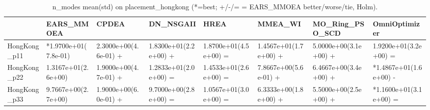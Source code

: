 \begin{table}[t]
\centering
\caption{n_modes mean(std) on placement_hongkong (*=best; +/-/= = EARS_MMOEA better/worse/tie, Holm).}
\label{tab:placement_hongkong_n_modes}
\begin{tabular}{llllllll}
\toprule
 & EARS\_MMOEA & CPDEA & DN\_NSGAII & HREA & MMEA\_WI & MO\_Ring\_PSO\_SCD & OmniOptimizer \\
\midrule
HongKong\_p11 & *1.9700e+01(7.8e-01) & 2.3000e+00(4.6e-01) + & 1.8300e+01(2.2e+00) + & 1.8700e+01(4.5e+00) = & 1.4567e+01(1.7e+00) + & 5.0000e+00(3.1e+00) + & 1.9200e+01(3.2e+00) = \\
HongKong\_p22 & 1.3167e+01(2.6e+00) & 1.9000e+00(4.7e-01) + & 1.2833e+01(2.0e+00) = & 1.4533e+01(2.6e+00) = & 7.8667e+00(5.6e-01) + & 6.4667e+00(3.4e+00) + & *1.4867e+01(1.6e+00) - \\
HongKong\_p33 & 9.7667e+00(2.7e+00) & 1.9000e+00(6.0e-01) + & 9.7000e+00(2.8e+00) = & 1.0567e+01(3.0e+00) = & 6.3333e+00(1.8e+00) + & 5.5000e+00(2.5e+00) + & *1.1600e+01(3.1e+00) = \\
\bottomrule
\end{tabular}
\end{table}
